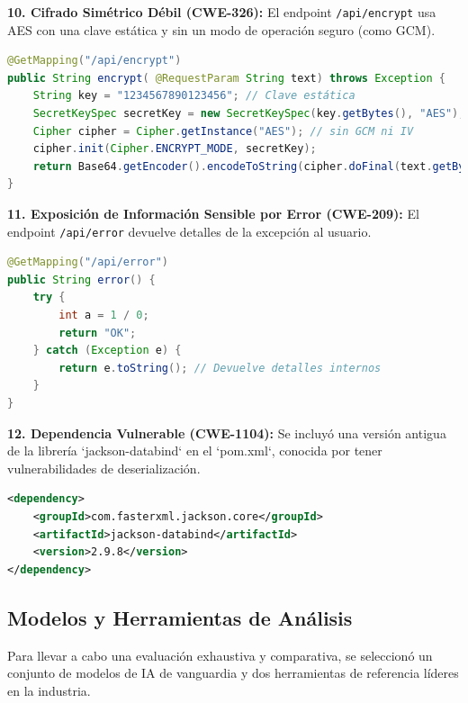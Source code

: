 \textbf{10. Cifrado Simétrico Débil (CWE-326):} El endpoint \texttt{/api/encrypt} usa AES con una clave estática y sin un modo de operación seguro (como GCM).
\begin{lstlisting}[language=java, caption={Cifrado simétrico débil (AES con clave fija).}]
@GetMapping("/api/encrypt")
public String encrypt( @RequestParam String text) throws Exception {
    String key = "1234567890123456"; // Clave estática
    SecretKeySpec secretKey = new SecretKeySpec(key.getBytes(), "AES");
    Cipher cipher = Cipher.getInstance("AES"); // sin GCM ni IV
    cipher.init(Cipher.ENCRYPT_MODE, secretKey);
    return Base64.getEncoder().encodeToString(cipher.doFinal(text.getBytes()));
}
\end{lstlisting}

\textbf{11. Exposición de Información Sensible por Error (CWE-209):} El endpoint \texttt{/api/error} devuelve detalles de la excepción al usuario.
\begin{lstlisting}[language=java, caption={Manejo de excepciones que expone información.}]
@GetMapping("/api/error")
public String error() {
    try {
        int a = 1 / 0;
        return "OK";
    } catch (Exception e) {
        return e.toString(); // Devuelve detalles internos
    }
}
\end{lstlisting}

\textbf{12. Dependencia Vulnerable (CWE-1104):} Se incluyó una versión antigua de la librería `jackson-databind` en el `pom.xml`, conocida por tener vulnerabilidades de deserialización.
\begin{lstlisting}[language=xml, caption={Dependencia vulnerable en pom.xml.}]
<dependency>
    <groupId>com.fasterxml.jackson.core</groupId>
    <artifactId>jackson-databind</artifactId>
    <version>2.9.8</version> 
</dependency>
\end{lstlisting}

\subsection{Modelos y Herramientas de Análisis}

Para llevar a cabo una evaluación exhaustiva y comparativa, se seleccionó un conjunto de modelos de IA de vanguardia y dos herramientas de referencia líderes en la industria.

